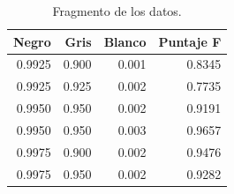 \documentclass[12pt,letterpaper]{article}
\begin{document}
\begin{table}
\centering
\caption{Fragmento de los datos.}
\begin{tabular}{rrrr}
  \hline
Negro & Gris & Blanco & Puntaje F \\ 
  \hline
0.9925 & 0.900 & 0.001 & 0.8345\\
0.9925 & 0.925 & 0.002 & 0.7735\\
0.9950 & 0.950 & 0.002 & 0.9191\\
0.9950 & 0.950 & 0.003 & 0.9657\\
0.9975 & 0.900 & 0.002 & 0.9476\\
0.9975 & 0.950 & 0.002 & 0.9282\\
\hline
\end{tabular}
\label{data}
\end{table}




 

\end{document}
